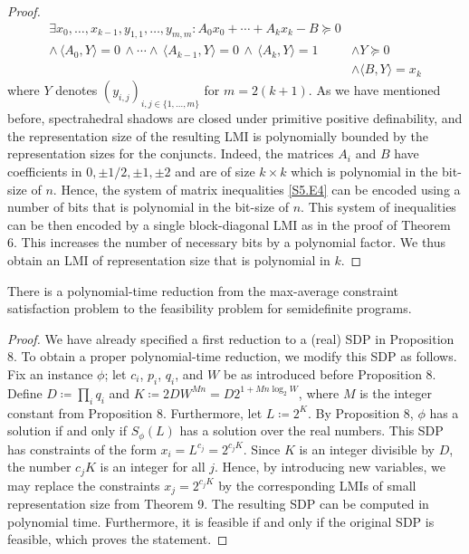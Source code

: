 \begin{proof}
\begin{equation}\tag{4}\label{S5.E4}
\begin{aligned}
\displaystyle\exists x_{0},\dots,x_{k-1},y_{1,1},\dots,y_{m,m}:A_{0}x_{0}+\cdots+A_{k}x_{k}-B\succeq 0 &  \\
\displaystyle\wedge\,\langle A_{0},Y\rangle=0\,\wedge\cdots\wedge\,\langle A_{k-1},Y\rangle=0\,\wedge\,\langle A_{k},Y\rangle=1 & \displaystyle\wedge Y\succeq 0 \\
 & \displaystyle\wedge\langle B,Y\rangle=x_{k}
\end{aligned}
\end{equation}
where $Y$ denotes $(y_{i,j})_{i,j\in\{1,\dots,m\}}$ for $m=2(k+1)$. As we have mentioned before, spectrahedral shadows are closed under primitive positive definability, and the representation size of the resulting LMI is polynomially bounded by the representation sizes for the conjuncts. Indeed, the matrices $A_{i}$ and $B$ have coefficients in ${0,\pm 1/2,\pm 1,\pm 2}$ and are of size $k\times k$ which is polynomial in the bit-size of $n$. Hence, the system of matrix inequalities \eqref{S5.E4} can be encoded using a number of bits that is polynomial in the bit-size of $n$. This system of inequalities can be then encoded by a single block-diagonal LMI as in the proof of Theorem 6. This increases the number of necessary bits by a polynomial factor. We thus obtain an LMI of representation size that is polynomial in $k$. 

\end{proof}

\setcounter{theorem}{9}
\begin{corollary}\label{Thmtheorem10}
There is a polynomial-time reduction from the max-average constraint satisfaction problem to the feasibility problem for semidefinite programs.

\end{corollary}

\begin{proof}
We have already specified a first reduction to a (real) SDP in Proposition 8. To obtain a proper polynomial-time reduction, we modify this SDP as follows. Fix an instance $\phi$; let $c_{i}$, $p_{i}$, $q_{i}$, and $W$ be as introduced before Proposition 8. Define $D\coloneqq\prod_{i}q_{i}$ and $K\coloneqq 2DW^{Mn}=D2^{1+Mn\log_{2}W}$, where $M$ is the integer constant from Proposition 8. Furthermore, let $L\coloneqq 2^{K}$. By Proposition 8, $\phi$ has a solution if and only if $S_{\phi}(L)$ has a solution over the real numbers. This SDP has constraints of the form $x_{i}=L^{c_{j}}=2^{c_{j}K}$. Since $K$ is an integer divisible by $D$, the number $c_{j}K$ is an integer for all $j$. Hence, by introducing new variables, we may replace the constraints $x_{j}=2^{c_{j}K}$ by the corresponding LMIs of small representation size from Theorem 9. The resulting SDP can be computed in polynomial time. Furthermore, it is feasible if and only if the original SDP is feasible, which proves the statement. 

\end{proof}

